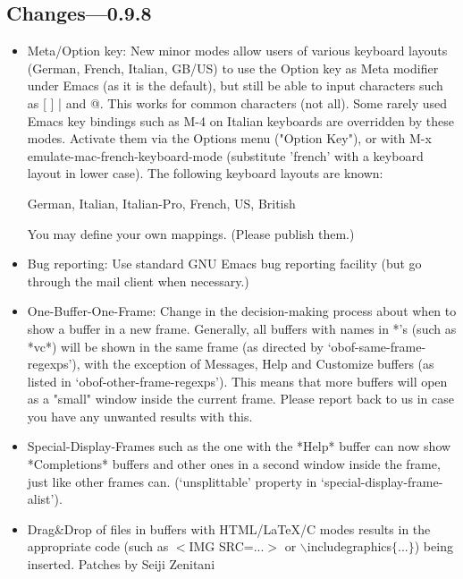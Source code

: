 \subsection{Changes---0.9.8}

\begin{itemize}

\item Meta/Option key: New minor modes allow users of various
        keyboard layouts (German, French, Italian, GB/US) to use the
        Option key as Meta modifier under Emacs (as it is the
        default), but still be able to input characters such as [ ] {
        } | and @. This works for common characters (not all). Some
        rarely used Emacs key bindings such as M-4 on Italian
        keyboards are overridden by these modes. Activate them via the
        Options menu ("Option Key"), or with M-x
        emulate-mac-french-keyboard-mode (substitute 'french' with
        a keyboard layout in lower case).
        The following keyboard layouts are known:

        German, Italian, Italian-Pro, French, US, British

        You may define your own mappings. (Please publish them.)

\item Bug reporting: Use standard GNU Emacs bug reporting facility
        (but go through the mail client when necessary.)

\item One-Buffer-One-Frame: Change in the decision-making process
        about when to show a buffer in a new frame. Generally, all buffers
        with names in *'s (such as *vc*) will be shown in the same
        frame (as directed by `obof-same-frame-regexps'), with the
        exception of Messages, Help and Customize buffers (as listed in
        `obof-other-frame-regexps'). This means that more buffers will
        open as a "small" window inside the current frame. Please report
        back to us in case you have any unwanted results with this.

\item Special-Display-Frames such as the one with the *Help* buffer
        can now show *Completions* buffers and other ones in a second
        window inside the frame, just like other frames can.
        (`unsplittable' property in `special-display-frame-alist').

\item Drag\&Drop of files in buffers with HTML/LaTeX/C modes results in
        the appropriate code (such as $<$IMG SRC=...$>$ or
        $\backslash$includegraphics$\{$...$\}$) being inserted.
        Patches by Seiji Zenitani


\end{itemize}
